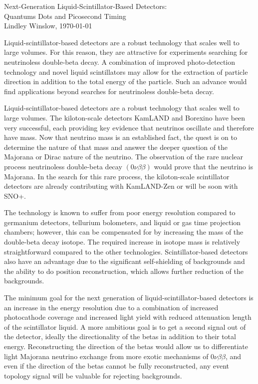 \documentclass[11pt]{article}
\begin{document}
 
\begin{center}
\Large{Next-Generation Liquid-Scintillator-Based Detectors: \\ Quantums Dots and Picosecond Timing}\\[0.25cm]
\large{Lindley Winslow,  \today}\\[0.25cm]
\end{center}

Liquid-scintillator-based detectors are a robust technology that scales well to large volumes. For this reason, they are attractive for experiments searching for neutrinoless double-beta decay.  A combination of improved photo-detection technology and novel liquid scintillators may allow for the extraction of particle direction in addition to the total energy of the particle. Such an advance would find applications beyond searches for neutrinoless double-beta decay. 

Liquid-scintillator-based detectors are a robust technology that scales well to large volumes. The kiloton-scale detectors KamLAND\cite{Gando:2010aa} and Borexino\cite{borexinobe7} have been very successful, each providing key evidence that neutrinos oscillate and therefore have mass. Now that neutrino mass is an established fact, the quest is on to determine the nature of that mass and answer the deeper question of the Majorana or Dirac nature of the neutrino. The observation of the rare nuclear process neutrinoless double-beta decay $(0\nu\beta\beta)$ would prove that the neutrino is Majorana. In the search for this rare process, the kiloton-scale scintillator detectors are already contributing with KamLAND-Zen\cite{KZ0nu,KZMaj,KZ2nu}  or will be soon with SNO+\cite{snop}. 

The technology is known to suffer from poor energy resolution compared to germanium detectors, tellurium bolometers, and liquid or gas time projection chambers; however, this can be compensated for by increasing the mass of the double-beta decay isotope.  The required increase in isotope mass is relatively straightforward compared to the other technologies. Scintillator-based detectors also have an advantage due to the significant self-shielding of backgrounds and the ability to do position reconstruction, which allows further reduction of the backgrounds. 

The minimum goal for the next generation of liquid-scintillator-based detectors is an increase in the energy resolution due to a combination of increased photocathode coverage and increased light yield with reduced attenuation length of the scintillator liquid.  A more ambitious goal is to get a second signal out of the detector, ideally the directionality of the betas in addition to their total energy.  Reconstructing the direction of the betas would allow us to differentiate light Majorana neutrino exchange from more exotic mechanisms of $0\nu\beta\beta$\cite{angcorr}, and even if the direction of the betas cannot be fully reconstructed, any event topology signal will be valuable for rejecting backgrounds.
\end{document}

